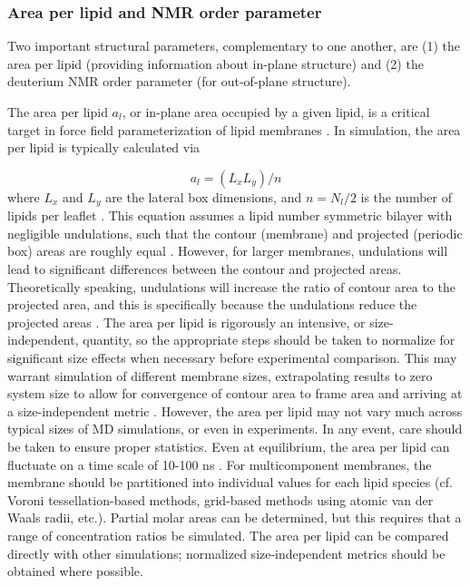\documentclass[9pt,bestpractices]{livecoms}
\begin{document}
\subsubsection{Area per lipid and NMR order parameter}
\label{subsubsec:aplnmr}
Two important structural parameters, complementary to one another, are (1) the area per lipid (providing information about in-plane structure) and (2) the deuterium NMR order parameter (for out-of-plane structure).

The area per lipid $a_l$, or in-plane area occupied by a given lipid, is a critical target in force field parameterization of lipid membranes \cite{Venable2015}.
In simulation, the area per lipid is typically calculated via

\begin{equation}\label{eq:5}
	a_l=(L_x L_y)/n
\end{equation}
where $L_x$ and $L_y$ are the lateral box dimensions, and $n=N_l/2$ is the number of lipids per leaflet \cite{Poger2016}.
This equation assumes a lipid number symmetric bilayer with negligible undulations, such that the contour (membrane) and projected (periodic box) areas are roughly equal \cite{Venable2015}.
However, for larger membranes, undulations will lead to significant differences between the contour and projected areas.
Theoretically speaking, undulations will increase the ratio of contour area to the projected area, and this is specifically because the undulations reduce the projected areas \cite{Venable2015}.
The area per lipid is rigorously an intensive, or size-independent, quantity, so the appropriate steps should be taken to normalize for significant size effects when necessary before experimental comparison.
This may warrant simulation of different membrane sizes, extrapolating results to zero system size to allow for convergence of contour area to frame area and arriving at a size-independent metric \cite{Waheed2009}.
However, the area per lipid may not vary much across typical sizes of MD simulations, or even in experiments.
In any event, care should be taken to ensure proper statistics.
Even at equilibrium, the area per lipid can fluctuate on a time scale of 10-100 ns \cite{Poger2016}.
For multicomponent membranes, the membrane should be partitioned into individual values for each lipid species (cf. Voroni tessellation-based methods, grid-based methods using atomic van der Waals radii, etc.).
Partial molar areas can be determined, but this requires that a range of concentration ratios be simulated.
The area per lipid can be compared directly with other simulations; normalized size-independent metrics should be obtained where possible.
\end{document}
